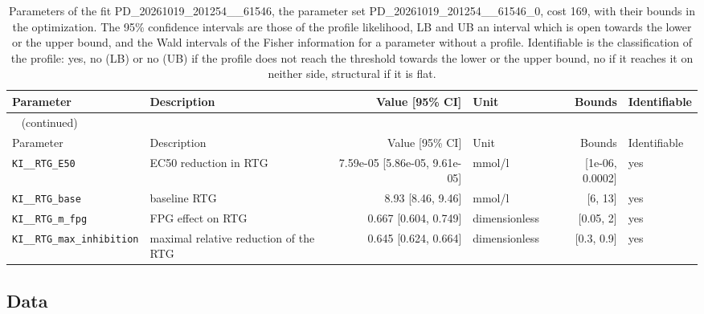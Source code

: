 \documentclass{article}
\begin{document}
\begin{longtable}{llrlrl}
\caption{Parameters of the fit PD\_20261019\_201254\_\_61546, the parameter set PD\_20261019\_201254\_\_61546\_0, cost 169, with their bounds in the optimization. The 95\% confidence intervals are those of the profile likelihood, LB and UB an interval which is open towards the lower or the upper bound, and the Wald intervals of the Fisher information for a parameter without a profile. Identifiable is the classification of the profile: yes, no (LB) or no (UB) if the profile does not reach the threshold towards the lower or the upper bound, no if it reaches it on neither side, structural if it is flat.}\label{tab:parameters:PD_20261019_201254__61546} \\
\toprule
Parameter & Description & Value [95\% CI] & Unit & Bounds & Identifiable \\
\midrule
\endfirsthead
\multicolumn{6}{l}{\small\tablename~\thetable{} (continued)} \\
\toprule
Parameter & Description & Value [95\% CI] & Unit & Bounds & Identifiable \\
\midrule
\endhead
\bottomrule
\endlastfoot
\texttt{KI\_\_RTG\_E50} & EC50 reduction in RTG & 7.59e-05 [5.86e-05, 9.61e-05] & mmol/l & [1e-06, 0.0002] & yes \\
\texttt{KI\_\_RTG\_base} & baseline RTG & 8.93 [8.46, 9.46] & mmol/l & [6, 13] & yes \\
\texttt{KI\_\_RTG\_m\_fpg} & FPG effect on RTG & 0.667 [0.604, 0.749] & dimensionless & [0.05, 2] & yes \\
\texttt{KI\_\_RTG\_max\_inhibition} & maximal relative reduction of the RTG & 0.645 [0.624, 0.664] & dimensionless & [0.3, 0.9] & yes \\
\end{longtable}

\subsection{Data}
\end{document}
